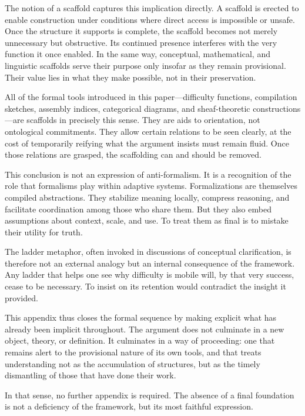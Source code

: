 \documentclass[12pt]{article}
\begin{document}
The notion of a scaffold captures this implication directly. A scaffold is erected to enable construction under conditions where direct access is impossible or unsafe. Once the structure it supports is complete, the scaffold becomes not merely unnecessary but obstructive. Its continued presence interferes with the very function it once enabled. In the same way, conceptual, mathematical, and linguistic scaffolds serve their purpose only insofar as they remain provisional. Their value lies in what they make possible, not in their preservation.

All of the formal tools introduced in this paper—difficulty functions, compilation sketches, assembly indices, categorical diagrams, and sheaf-theoretic constructions—are scaffolds in precisely this sense. They are aids to orientation, not ontological commitments. They allow certain relations to be seen clearly, at the cost of temporarily reifying what the argument insists must remain fluid. Once those relations are grasped, the scaffolding can and should be removed.

This conclusion is not an expression of anti-formalism. It is a recognition of the role that formalisms play within adaptive systems. Formalizations are themselves compiled abstractions. They stabilize meaning locally, compress reasoning, and facilitate coordination among those who share them. But they also embed assumptions about context, scale, and use. To treat them as final is to mistake their utility for truth.

The ladder metaphor, often invoked in discussions of conceptual clarification, is therefore not an external analogy but an internal consequence of the framework. Any ladder that helps one see why difficulty is mobile will, by that very success, cease to be necessary. To insist on its retention would contradict the insight it provided.

This appendix thus closes the formal sequence by making explicit what has already been implicit throughout. The argument does not culminate in a new object, theory, or definition. It culminates in a way of proceeding: one that remains alert to the provisional nature of its own tools, and that treats understanding not as the accumulation of structures, but as the timely dismantling of those that have done their work.

In that sense, no further appendix is required. The absence of a final foundation is not a deficiency of the framework, but its most faithful expression.
\end{document}

